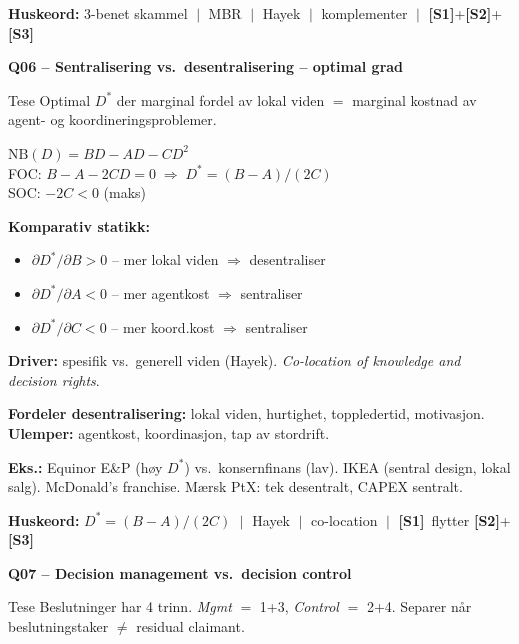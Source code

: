 \documentclass[10pt, a4paper]{article}
\newcommand{\SOne}{\textcolor{s1color}{\textbf{[S1]}}}
\newcommand{\STwo}{\textcolor{s2color}{\textbf{[S2]}}}
\newcommand{\SThree}{\textcolor{s3color}{\textbf{[S3]}}}
\newcommand{\qhead}[2]{%
  \noindent
  \begin{tcolorbox}[colback=boxborder, colframe=boxborder, arc=2pt, left=6pt, right=6pt, top=2pt, bottom=2pt]
    \color{white}\textbf{\large Q#1 -- #2}
  \end{tcolorbox}
}
\newcommand{\huskeord}[1]{%
  \vspace{2pt}
  \begin{tcolorbox}[colback=yellow!15, colframe=orange!70!black, boxrule=0.4pt, arc=2pt, left=4pt, right=4pt, top=2pt, bottom=2pt]
    \footnotesize\textbf{Huskeord:} #1
  \end{tcolorbox}
}
\begin{document}
\huskeord{3-benet skammel $\;\big|\;$ MBR $\;\big|\;$ Hayek $\;\big|\;$ komplementer $\;\big|\;$ \SOne+\STwo+\SThree}

\vfill\newpage

\qhead{06}{Sentralisering vs.\ desentralisering -- optimal grad}

\begin{keybox}{Tese}
Optimal $D^{*}$ der marginal fordel av lokal viden $=$ marginal kostnad av agent- og koordineringsproblemer.
\end{keybox}

\begin{formulabox}
$\mathrm{NB}(D) = BD - AD - CD^{2}$ \\
FOC: $B - A - 2CD = 0 \;\Rightarrow\; D^{*} = (B-A)/(2C)$ \\
SOC: $-2C < 0$ (maks)
\end{formulabox}

\textbf{Komparativ statikk:}
\begin{itemize}
  \item $\partial D^{*}/\partial B > 0$ -- mer lokal viden $\Rightarrow$ desentraliser
  \item $\partial D^{*}/\partial A < 0$ -- mer agentkost $\Rightarrow$ sentraliser
  \item $\partial D^{*}/\partial C < 0$ -- mer koord.kost $\Rightarrow$ sentraliser
\end{itemize}

\textbf{Driver:} spesifik vs.\ generell viden (Hayek). \emph{Co-location of knowledge and decision rights}.

\textbf{Fordeler desentralisering:} lokal viden, hurtighet, toppledertid, motivasjon. \textbf{Ulemper:} agentkost, koordinasjon, tap av stordrift.

\textbf{Eks.:} Equinor E\&P (høy $D^{*}$) vs.\ konsernfinans (lav). IKEA (sentral design, lokal salg). McDonald's franchise. Mærsk PtX: tek desentralt, CAPEX sentralt.

\huskeord{$D^{*}=(B-A)/(2C)$ $\;\big|\;$ Hayek $\;\big|\;$ co-location $\;\big|\;$ \SOne\ flytter \STwo+\SThree}

\vfill\newpage

\qhead{07}{Decision management vs.\ decision control}

\begin{keybox}{Tese}
Beslutninger har 4 trinn. \emph{Mgmt} $=$ 1+3, \emph{Control} $=$ 2+4. Separer når beslutningstaker $\neq$ residual claimant.
\end{keybox}
\end{document}
